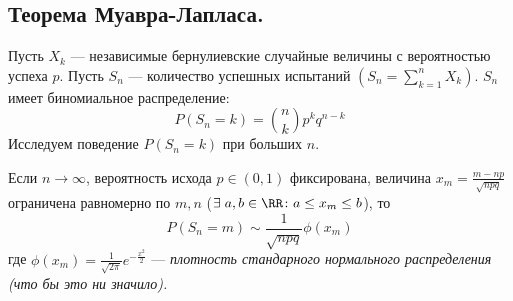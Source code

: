 \subsection{Теорема Муавра-Лапласа.}
Пусть $X_k$ --- независимые бернулиевские случайные величины с вероятностью успеха $p$. Пусть $S_n$ --- количество успешных испытаний
$\left( S_n = \sum\limits_{k = 1}^{n} X_k \right)$. $S_n$ имеет биномиальное распределение:
\[
    P(S_n = k) = \binom{n}{k}p^{k}q^{n - k}
\]
Исследуем поведение $P(S_n = k)$ при больших $n$.
\begin{theorem}
    Если $n \to \infty$, вероятность исхода $p \in (0, 1)$ фиксирована, величина $x_m = \frac{m - np}{\sqrt{npq}}$ ограничена
    равномерно по $m, n$ ($\exists\;a, b \in \RR \colon a \leq x_m \leq b$), то
    \[
        P(S_n = m) \sim \frac{1}{\sqrt{npq}}\phi(x_m)
    \]
    где $\phi(x_m) = \frac{1}{\sqrt{2\pi}}e^{-\frac{x^2}{2}}$ --- \it{плотность стандарного нормального распределения} (что
    бы это ни значило).
\end{theorem}